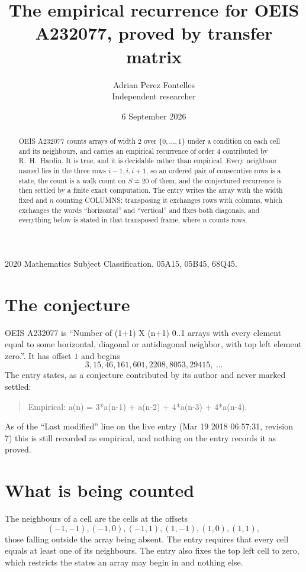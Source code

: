 \documentclass[11pt,a4paper]{article}
\title{The empirical recurrence for OEIS A232077, proved by transfer matrix}
\author{Adrian Perez Fontelles\\ \small Independent researcher}
\date{6 September 2026}
\theoremstyle{plain}
\theoremstyle{definition}
\begin{document}
\maketitle

\begin{abstract}
OEIS A232077 counts arrays of width $2$ over $\{0,\dots,1\}$ under a condition on each cell
and its neighbours, and carries an empirical recurrence of order $4$ contributed by
R.~H.~Hardin. It is true, and it is decidable rather than empirical. Every neighbour named lies
in the three rows $i-1,i,i+1$, so an ordered pair of consecutive rows is a state, the count is
a walk count on $S=20$ of them, and the conjectured recurrence is then settled by a finite
exact computation. The entry writes the array with the width fixed and $n$ counting
COLUMNS; transposing it exchanges rows with columns, which exchanges the words ``horizontal''
and ``vertical'' and fixes both diagonals, and everything below is stated in that transposed
frame, where $n$ counts rows.
\end{abstract}

\noindent\small 2020 Mathematics Subject Classification. 05A15, 05B45, 68Q45.\normalsize

\section{The conjecture}

OEIS A232077 is ``Number of (1+1) X (n+1) 0..1 arrays with every element equal to some horizontal, diagonal or antidiagonal neighbor, with top left element zero.''. It has offset $1$ and begins
\[
3, 15, 46, 161, 601, 2208, 8053, 29415,\ \dots
\]
The entry states, as a conjecture contributed by its author and never marked settled:
\begin{quote}
Empirical: a(n) = 3*a(n-1) + a(n-2) + 4*a(n-3) + 4*a(n-4).
\end{quote}
As of the ``Last modified'' line on the live entry (Mar 19 2018 06:57:31, revision 7) this is still
recorded as empirical, and nothing on the entry records it as proved.

\section{What is being counted}

The neighbours of a cell are the cells at the offsets
\[
(-1,-1), (-1,0), (-1,1), (1,-1), (1,0), (1,1),
\]
those falling outside the array being absent. The entry requires that every cell equals at least one of its neighbours. The entry also fixes the top left cell to zero, which restricts the states an array may begin in and nothing else.
\end{document}
